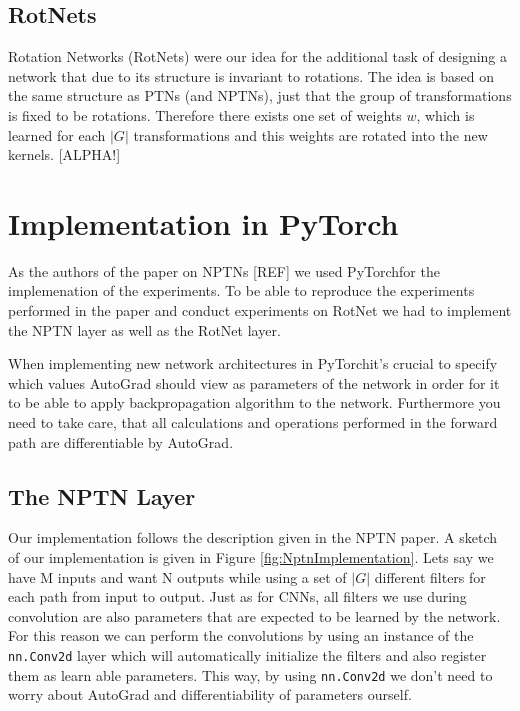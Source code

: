 \documentclass{llncs}
\begin{document}
\subsection{RotNets}
Rotation Networks (RotNets) were our idea for the additional task of designing a network that due to its structure is invariant to rotations. 
The idea is based on the same structure as PTNs (and NPTNs), just that the group of transformations is fixed to be rotations. Therefore there exists one set of weights $w$, which is learned for each $|G|$ transformations and this weights are rotated into the new kernels. 
[ALPHA!]
\newcommand{\pytorch}{PyTorch}
\section{Implementation in \pytorch}
\newcommand{\nnaffinegrid}{\nolinkurl{nn.functional.affine\textunderscore grid} }
\newcommand{\nngridsample}{\nolinkurl{nn.functional.grid\textunderscore sample} }
\newcommand{\nnConvFunction}{\nolinkurl{nn.functional.conv2d} }
\newcommand{\nnConvLayer}{\nolinkurl{nn.Conv2d} }
\newcommand{\nnMaxPool}{\nolinkurl{nn.MaxPool3d} }
\newcommand{\nnAvgPool}{\nolinkurl{nn.AvgPool3d} }



As the authors of the paper on NPTNs [REF] we used \pytorch for the implemenation of the experiments.
To be able to reproduce the experiments performed in the paper and conduct experiments on RotNet we had to implement the NPTN layer as well as the RotNet layer.

When implementing new network architectures in \pytorch it's crucial to specify which values AutoGrad should view as parameters of the network in order for it to be able to apply backpropagation algorithm to the network. Furthermore you need to take care, that all calculations and operations performed in the forward path are differentiable by AutoGrad.
\subsection{The NPTN Layer}
Our implementation follows the description given in the NPTN paper. A sketch of our implementation is given in Figure \ref{fig:NptnImplementation}.
Lets say we have M inputs and want N outputs while using a set of $|G|$ different filters for each path from input to output.
Just as for CNNs, all filters we use during convolution are also parameters that are expected to be learned by the network.
For this reason we can perform the convolutions by using an instance of the \nnConvLayer layer which will automatically initialize the filters and also register them as learn able parameters. This way, by using \nnConvLayer we don't need to worry about AutoGrad and differentiability of parameters ourself.
\end{document}
